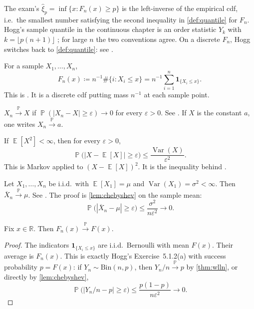 \documentclass[11pt,a4paper]{article}
\DeclareMathOperator{\Var}{Var}
\DeclareMathOperator{\E}{\mathbb{E}}
\DeclareMathOperator{\Pbb}{\mathbb{P}}
\begin{document}
The exam's \(\hat{\xi}_p=\inf\{x:F_n(x)\ge p\}\) is the left-inverse of the empirical cdf, i.e.\ the smallest number satisfying the second inequality in \cref{def:quantile} for \(F_n\). Hogg's sample quantile in the continuous chapter is an order statistic \(Y_k\) with \(k=\lfloor p(n+1)\rfloor\) \citep[\S4.4.1]{hogg2019}; for large \(n\) the two conventions agree. On a discrete \(F_n\), Hogg switches back to \cref{def:quantile}: see \citep[Remark~10.1.1]{hogg2019}.

\begin{definition}
\label{def:ecdf}
For a sample \(X_1,\dots,X_n\),
\[
F_n(x)
\coloneqq
n^{-1}\#\{i:X_i\le x\}
=
n^{-1}\sum_{i=1}^{n}\mathbf{1}_{\{X_i\le x\}}.
\]
This is \citep[(10.1.1)]{hogg2019}. It is a discrete cdf putting mass \(n^{-1}\) at each sample point.
\end{definition}

\begin{definition}
\label{def:conv-p}
\(X_n\xrightarrow{\Pbb}X\) if \(\Pbb(|X_n-X|\ge\varepsilon)\to 0\) for every \(\varepsilon>0\). See \citep[Definition~5.1.1]{hogg2019}. If \(X\) is the constant \(a\), one writes \(X_n\xrightarrow{\Pbb}a\).
\end{definition}

\begin{lemma}[Chebyshev]
\label{lem:chebyshev}
If \(\E[X^2]<\infty\), then for every \(\varepsilon>0\),
\[
\Pbb\bigl(|X-\E[X]|\ge\varepsilon\bigr)
\le
\frac{\Var(X)}{\varepsilon^2}.
\]
This is Markov applied to \((X-\E[X])^2\). It is the inequality behind \citep[Theorem~5.1.1]{hogg2019}.
\end{lemma}

\begin{theorem}
\label{thm:wlln}
Let \(X_1,\dots,X_n\) be i.i.d.\ with \(\E[X_1]=\mu\) and \(\Var(X_1)=\sigma^2<\infty\). Then \(\overline{X}_n\xrightarrow{\Pbb}\mu\). See \citep[Theorem~5.1.1]{hogg2019}. The proof is \cref{lem:chebyshev} on the sample mean:
\[
\Pbb\bigl(|\overline{X}_n-\mu|\ge\varepsilon\bigr)
\le
\frac{\sigma^2}{n\varepsilon^2}
\to 0.
\]
\end{theorem}

\begin{lemma}
\label{lem:Fn-pointwise}
Fix \(x\in\mathbb{R}\). Then \(F_n(x)\xrightarrow{\Pbb}F(x)\).
\end{lemma}

\begin{proof}
The indicators \(\mathbf{1}_{\{X_i\le x\}}\) are i.i.d.\ Bernoulli with mean \(F(x)\). Their average is \(F_n(x)\). This is exactly Hogg's Exercise~5.1.2(a) with success probability \(p=F(x)\): if \(Y_n\sim\mathrm{Bin}(n,p)\), then \(Y_n/n\xrightarrow{\Pbb}p\) by \cref{thm:wlln}, or directly by \cref{lem:chebyshev},
\[
\Pbb\bigl(|Y_n/n-p|\ge\varepsilon\bigr)
\le
\frac{p(1-p)}{n\varepsilon^2}
\to 0.
\]
\end{proof}
\end{document}
